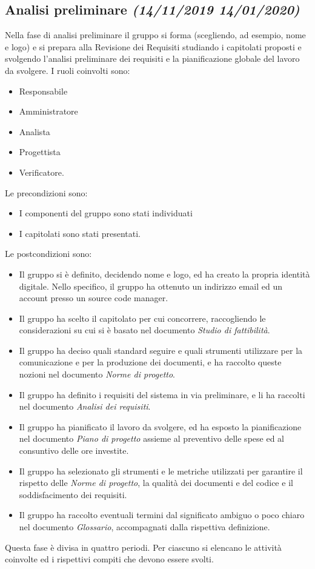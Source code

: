 \documentclass[../piano-di-progetto.tex]{subfiles}
\begin{document}
\subsection[Analisi preliminare]{Analisi preliminare {\normalsize\normalfont\itshape(14/11/2019  14/01/2020)}}%
\label{sub:analisi_preliminare}
Nella fase di analisi preliminare il gruppo si forma (scegliendo, ad esempio, nome e logo) e si prepara alla Revisione dei Requisiti studiando i capitolati proposti e svolgendo l'analisi preliminare dei requisiti e la pianificazione globale del lavoro da svolgere.
I ruoli coinvolti sono:
\begin{itemize}
  \item Responsabile
  \item Amministratore
  \item Analista
  \item Progettista
  \item Verificatore.
\end{itemize}
Le precondizioni sono:
\begin{itemize}
  \item I componenti del gruppo sono stati individuati
  \item I capitolati sono stati presentati.
\end{itemize}
Le postcondizioni sono:
\begin{itemize}
  \item Il gruppo si è definito, decidendo nome e logo, ed ha creato la propria identità digitale. Nello specifico, il gruppo ha ottenuto un indirizzo email ed un account presso un source code manager.
  \item Il gruppo ha scelto il capitolato per cui concorrere, raccogliendo le considerazioni su cui si è basato nel documento \textit{Studio di fattibilità}.
  \item Il gruppo ha deciso quali standard seguire e quali strumenti utilizzare per la comunicazione e per la produzione dei documenti, e ha raccolto queste nozioni nel documento \textit{Norme di progetto}.
  \item Il gruppo ha definito i requisiti del sistema in via preliminare, e li ha raccolti nel documento \textit{Analisi dei requisiti}.
  \item Il gruppo ha pianificato il lavoro da svolgere, ed ha esposto la pianificazione nel documento \textit{Piano di progetto} assieme al preventivo delle spese ed al consuntivo delle ore investite.
  \item Il gruppo ha selezionato gli strumenti e le metriche utilizzati per garantire il rispetto delle \textit{Norme di progetto}, la qualità dei documenti e del codice e il soddisfacimento dei requisiti.
  \item Il gruppo ha raccolto eventuali termini dal significato ambiguo o poco chiaro nel documento \textit{Glossario}, accompagnati dalla rispettiva definizione.
\end{itemize}
Questa fase è divisa in quattro periodi.
Per ciascuno si elencano le attività coinvolte ed i rispettivi compiti che devono essere svolti.
\end{document}
